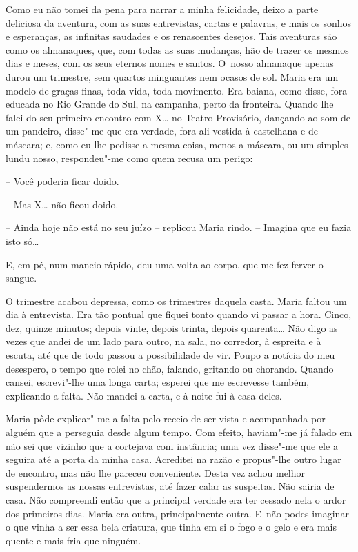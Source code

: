 Como eu não tomei da pena para narrar a minha felicidade, deixo a parte
deliciosa da aventura, com as suas entrevistas, cartas e palavras, e
mais os sonhos e esperanças, as infinitas saudades e os renascentes
desejos. Tais aventuras são como os almanaques, que, com todas as suas
mudanças, hão de trazer os mesmos dias e meses, com os seus eternos
nomes e santos. O~nosso almanaque apenas durou um trimestre, sem quartos
minguantes nem ocasos de sol. Maria era um modelo de graças finas, toda
vida, toda movimento. Era baiana, como disse, fora educada no Rio Grande
do Sul, na campanha, perto da fronteira. Quando lhe falei do seu
primeiro encontro com X\ldots{} no Teatro Provisório, dançando ao som de um
pandeiro, disse"-me que era verdade, fora ali vestida à castelhana e de
máscara; e, como eu lhe pedisse a mesma coisa, menos a máscara, ou um
simples lundu nosso, respondeu"-me como quem recusa um perigo:

-- Você poderia ficar doido.

-- Mas X\ldots{} não ficou doido.

-- Ainda hoje não está no seu juízo -- replicou Maria rindo. -- Imagina
que eu fazia isto só\ldots{}

E, em pé, num maneio rápido, deu uma volta ao corpo, que me fez ferver o
sangue.

O trimestre acabou depressa, como os trimestres daquela casta. Maria
faltou um dia à entrevista. Era tão pontual que fiquei tonto quando vi
passar a hora. Cinco, dez, quinze minutos; depois vinte, depois trinta,
depois quarenta\ldots{} Não digo as vezes que andei de um lado para outro, na
sala, no corredor, à espreita e à escuta, até que de todo passou a
possibilidade de vir. Poupo a notícia do meu desespero, o tempo que
rolei no chão, falando, gritando ou chorando. Quando cansei, escrevi"-lhe
uma longa carta; esperei que me escrevesse também, explicando a falta.
Não mandei a carta, e à noite fui à casa deles.

Maria pôde explicar"-me a falta pelo receio de ser vista e acompanhada
por alguém que a perseguia desde algum tempo. Com efeito, haviam"-me já
falado em não sei que vizinho que a cortejava com instância; uma vez
disse"-me que ele a seguira até a porta da minha casa. Acreditei na razão
e propus"-lhe outro lugar de encontro, mas não lhe pareceu conveniente.
Desta vez achou melhor suspendermos as nossas entrevistas, até fazer
calar as suspeitas. Não sairia de casa. Não compreendi então que a
principal verdade era ter cessado nela o ardor dos primeiros dias. Maria
era outra, principalmente outra. E~não podes imaginar o que vinha a ser
essa bela criatura, que tinha em si o fogo e o gelo e era mais quente e
mais fria que ninguém.

